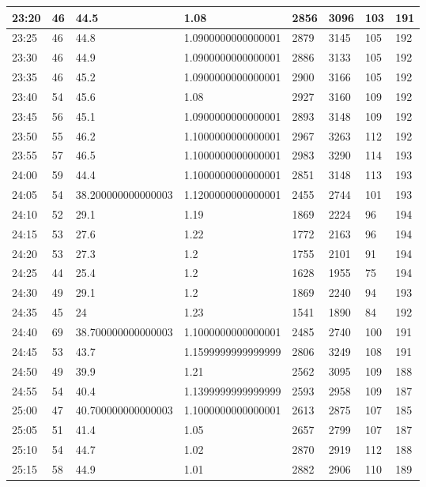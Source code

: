 \documentclass[
]{book}
\begin{document}
\begin{tabular}{l|l|l|l|l|l|l|l}
\hline
23:20 & 46 & 44.5 & 1.08 & 2856 & 3096 & 103 & 191\\
\hline
23:25 & 46 & 44.8 & 1.0900000000000001 & 2879 & 3145 & 105 & 192\\
\hline
23:30 & 46 & 44.9 & 1.0900000000000001 & 2886 & 3133 & 105 & 192\\
\hline
23:35 & 46 & 45.2 & 1.0900000000000001 & 2900 & 3166 & 105 & 192\\
\hline
23:40 & 54 & 45.6 & 1.08 & 2927 & 3160 & 109 & 192\\
\hline
23:45 & 56 & 45.1 & 1.0900000000000001 & 2893 & 3148 & 109 & 192\\
\hline
23:50 & 55 & 46.2 & 1.1000000000000001 & 2967 & 3263 & 112 & 192\\
\hline
23:55 & 57 & 46.5 & 1.1000000000000001 & 2983 & 3290 & 114 & 193\\
\hline
24:00 & 59 & 44.4 & 1.1000000000000001 & 2851 & 3148 & 113 & 193\\
\hline
24:05 & 54 & 38.200000000000003 & 1.1200000000000001 & 2455 & 2744 & 101 & 193\\
\hline
24:10 & 52 & 29.1 & 1.19 & 1869 & 2224 & 96 & 194\\
\hline
24:15 & 53 & 27.6 & 1.22 & 1772 & 2163 & 96 & 194\\
\hline
24:20 & 53 & 27.3 & 1.2 & 1755 & 2101 & 91 & 194\\
\hline
24:25 & 44 & 25.4 & 1.2 & 1628 & 1955 & 75 & 194\\
\hline
24:30 & 49 & 29.1 & 1.2 & 1869 & 2240 & 94 & 193\\
\hline
24:35 & 45 & 24 & 1.23 & 1541 & 1890 & 84 & 192\\
\hline
24:40 & 69 & 38.700000000000003 & 1.1000000000000001 & 2485 & 2740 & 100 & 191\\
\hline
24:45 & 53 & 43.7 & 1.1599999999999999 & 2806 & 3249 & 108 & 191\\
\hline
24:50 & 49 & 39.9 & 1.21 & 2562 & 3095 & 109 & 188\\
\hline
24:55 & 54 & 40.4 & 1.1399999999999999 & 2593 & 2958 & 109 & 187\\
\hline
25:00 & 47 & 40.700000000000003 & 1.1000000000000001 & 2613 & 2875 & 107 & 185\\
\hline
25:05 & 51 & 41.4 & 1.05 & 2657 & 2799 & 107 & 187\\
\hline
25:10 & 54 & 44.7 & 1.02 & 2870 & 2919 & 112 & 188\\
\hline
25:15 & 58 & 44.9 & 1.01 & 2882 & 2906 & 110 & 189\\
\hline

\end{tabular}
\end{document}
